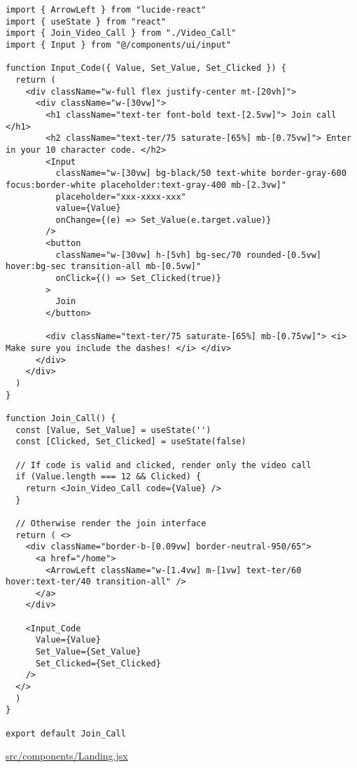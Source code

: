 \begin{verbatim}
import { ArrowLeft } from "lucide-react"
import { useState } from "react"
import { Join_Video_Call } from "./Video_Call"
import { Input } from "@/components/ui/input"

function Input_Code({ Value, Set_Value, Set_Clicked }) {
  return (
    <div className="w-full flex justify-center mt-[20vh]">
      <div className="w-[30vw]">
        <h1 className="text-ter font-bold text-[2.5vw]"> Join call </h1>
        <h2 className="text-ter/75 saturate-[65%] mb-[0.75vw]"> Enter in your 10 character code. </h2>
        <Input
          className="w-[30vw] bg-black/50 text-white border-gray-600 focus:border-white placeholder:text-gray-400 mb-[2.3vw]"
          placeholder="xxx-xxxx-xxx"
          value={Value}
          onChange={(e) => Set_Value(e.target.value)}
        />
        <button
          className="w-[30vw] h-[5vh] bg-sec/70 rounded-[0.5vw] hover:bg-sec transition-all mb-[0.5vw]"
          onClick={() => Set_Clicked(true)}
        >
          Join
        </button>

        <div className="text-ter/75 saturate-[65%] mb-[0.75vw]"> <i> Make sure you include the dashes! </i> </div>
      </div>
    </div>
  )
}

function Join_Call() {
  const [Value, Set_Value] = useState('')
  const [Clicked, Set_Clicked] = useState(false)

  // If code is valid and clicked, render only the video call
  if (Value.length === 12 && Clicked) {
    return <Join_Video_Call code={Value} />
  }

  // Otherwise render the join interface
  return ( <>
    <div className="border-b-[0.09vw] border-neutral-950/65">
      <a href="/home">
        <ArrowLeft className="w-[1.4vw] m-[1vw] text-ter/60 hover:text-ter/40 transition-all" />
      </a>
    </div>

    <Input_Code
      Value={Value}
      Set_Value={Set_Value}
      Set_Clicked={Set_Clicked}
    />
  </>
  )
}

export default Join_Call
\end{verbatim}

\underline{src/components/Landing.jsx}

